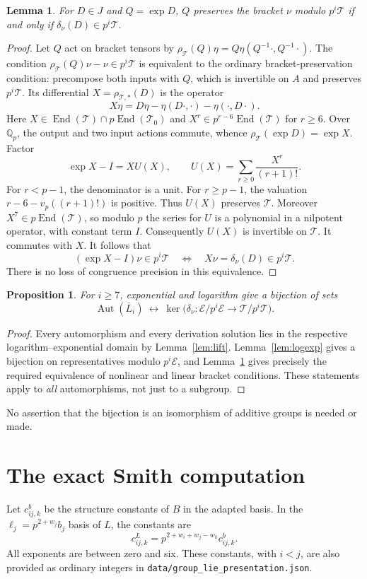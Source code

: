 \documentclass[11pt]{article}
\newtheorem{lemma}[theorem]{Lemma}
\newtheorem{proposition}[theorem]{Proposition}
\theoremstyle{definition}\newtheorem{definition}[theorem]{Definition}
\theoremstyle{remark}\newtheorem{remark}[theorem]{Remark}
\DeclareMathOperator{\Aut}{Aut}
\DeclareMathOperator{\End}{End}
\newcommand{\Qp}{\mathbb Q_p}
\newcommand{\EE}{\mathcal E}
\newcommand{\TT}{\mathcal T}
\begin{document}
\begin{lemma}\label{lem:tensor}
For $D\in J$ and $Q=\exp D$, $Q$ preserves the bracket $\nu$ modulo
$p^i\TT$ if and only if $\delta_\nu(D)\in p^i\TT$.
\end{lemma}
\begin{proof}
Let $Q$ act on bracket tensors by
$\rho_\TT(Q)\eta=Q\eta(Q^{-1}\cdot,Q^{-1}\cdot)$.
The condition $\rho_\TT(Q)\nu-\nu\in p^i\TT$ is equivalent to the
ordinary bracket-preservation condition: precompose both inputs with $Q$,
which is invertible on $A$ and preserves $p^i\TT$.
Its differential $X=\rho_{\TT,*}(D)$ is the operator
\[
 X\eta=D\eta-\eta(D\cdot,\cdot)-\eta(\cdot,D\cdot).
\]
Here $X\in\End(\TT)\cap p\End(\TT_0)$ and
$X^r\in p^{r-6}\End(\TT)$ for $r\ge6$.
Over $\Qp$, the output and two input actions commute, whence
$\rho_\TT(\exp D)=\exp X$.
Factor
\[
 \exp X-I=XU(X),\qquad
 U(X)=\sum_{r\ge0}\frac{X^r}{(r+1)!}.
\]
For $r<p-1$, the denominator is a unit. For $r\ge p-1$, the valuation
$r-6-v_p((r+1)!)$ is positive. Thus $U(X)$ preserves $\TT$.
Moreover $X^7\in p\End(\TT)$, so modulo $p$ the series for $U$ is a
polynomial in a nilpotent operator, with constant term $I$.
Consequently $U(X)$ is invertible on $\TT$. It commutes with $X$.
It follows that
\[
 (\exp X-I)\nu\in p^i\TT
 \quad\Longleftrightarrow\quad
 X\nu=\delta_\nu(D)\in p^i\TT.
\]
There is no loss of congruence precision in this equivalence.
\end{proof}

\begin{proposition}\label{prop:full-count}
For $i\ge7$, exponential and logarithm give a bijection of sets
\begin{equation}\label{eq:bijection}
 \Aut(\bar L_i)\ \longleftrightarrow\
 \ker\bigl(\delta_\nu:\EE/p^i\EE\longrightarrow\TT/p^i\TT\bigr).
\end{equation}
\end{proposition}
\begin{proof}
Every automorphism and every derivation solution lies in the respective
logarithm--exponential domain by Lemma~\ref{lem:lift}. Lemma~\ref{lem:logexp}
gives a bijection on representatives modulo $p^i\EE$, and
Lemma~\ref{lem:tensor} gives precisely the required equivalence of
nonlinear and linear bracket conditions. These statements apply to
\emph{all} automorphisms, not just to a subgroup.
\end{proof}
No assertion that the bijection is an isomorphism of additive groups is
needed or made.

\section{The exact Smith computation}
Let $c^b_{ij,k}$ be the structure constants of $B$ in the adapted basis.
In the $\ell_j=p^{2+w_j}b_j$ basis of $L$, the constants are
\begin{equation}\label{eq:scaledconstants}
 c^L_{ij,k}=p^{2+w_i+w_j-w_k}c^b_{ij,k}.
\end{equation}
All exponents are between zero and six. These constants, with $i<j$, are
also provided as ordinary integers in
\texttt{data/group\_lie\_presentation.json}.
\end{document}
